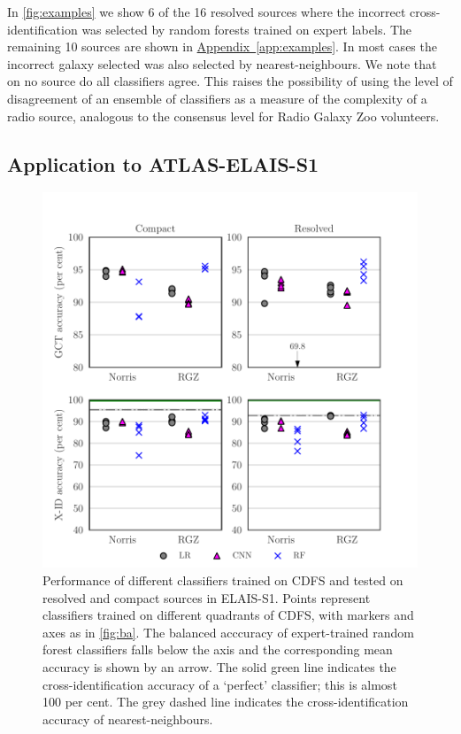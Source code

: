 \documentclass[fleqn,usenatbib,usedcolumn]{mnras}
\newcommand{\aref}[1]{\hyperref[#1]{Appendix~\ref{#1}}}
\begin{document}
    In \autoref{fig:examples} we show 6 of the 16 resolved sources where the incorrect cross-identification was selected by random forests trained on expert labels. The remaining 10 sources are shown in \aref{app:examples}. In most cases the incorrect galaxy selected was also selected by nearest-neighbours. We note that on no source do all classifiers agree. This raises the possibility of using the level of disagreement of an ensemble of classifiers as a measure of the complexity of a radio source, analogous to the consensus level for Radio Galaxy Zoo volunteers.

\subsection{Application to ATLAS-ELAIS-S1}
  \label{sec:elais}

  \begin{figure}
  \centering
  \includegraphics[width=\columnwidth]{images/elais-grid-new.pdf}
  \caption{Performance of different classifiers trained on CDFS and tested on resolved and compact sources in ELAIS-S1. Points represent classifiers trained on different quadrants of CDFS, with markers and axes as in \autoref{fig:ba}. The balanced acccuracy of expert-trained random forest classifiers falls below the axis and the corresponding mean accuracy is shown by an arrow. The solid green line indicates the cross-identification accuracy of a `perfect' classifier; this is almost 100 per cent. The grey dashed line indicates the cross-identification accuracy of nearest-neighbours.
    \label{fig:elais-ba}}
  \end{figure}
\end{document}
